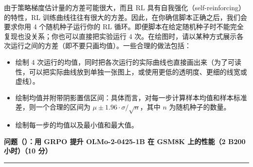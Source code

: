 由于策略梯度估计量的方差可能很大，而且 RL 具有自我强化（self-reinforcing）的特性，RL 训练曲线往往有很大的方差。因此，在你确信脚本正确之后，我们会要求你用 4 个随机种子运行你的 RL 循环。即便脚本在给定随机种子时不能完全复现也没关系；你也可以直接把实验运行 4 次。在绘图时，请以某种方式展示各次运行之间的方差（即不要只画均值）。一些合理的做法包括：

\begin{itemize}
  \item 绘制 4 次运行的均值，同时把各次运行的实际曲线也直接画出来（为了可读性，可以把实际曲线放到单独一张图上，或使用更低的透明度、更细的线宽或虚线）。
  \item 绘制均值并附带阴影置信区间：具体而言，对每一步计算样本均值和样本标准差，则一个合理的区间为 $\mu \pm 1.96 \cdot \sigma/\sqrt{n}$，其中 $n$ 为随机种子的数量。
\end{itemize}

\begin{itemize}
  \item 绘制每一步的均值以及最小值和最大值。
\end{itemize}

\medskip
\noindent\textbf{问题（）：用 GRPO 提升 OLMo-2-0425-1B 在 GSM8K 上的性能（2 B200 小时）（10 分）}
\par\nobreak\smallskip\hrule\nobreak\medskip

